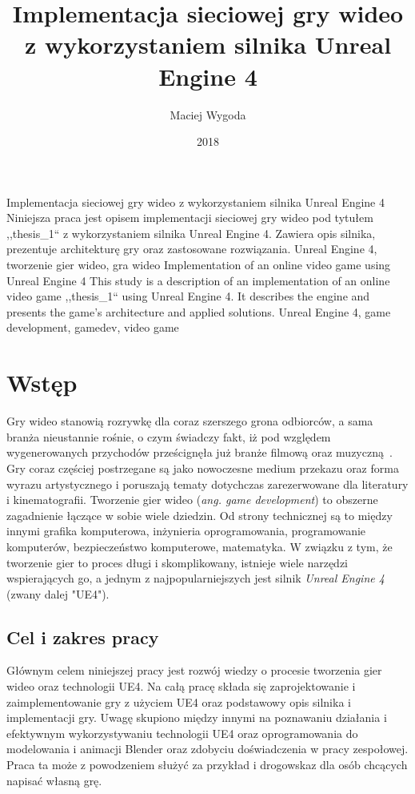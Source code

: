 \documentclass[multip]{SGGW-thesis}
\title{Implementacja sieciowej gry wideo z wykorzystaniem silnika Unreal Engine 4}
\author{Maciej Wygoda}
\date{2018}
\begin{document}
\maketitle
{}
\statementpage
\abstractpage
{Implementacja sieciowej gry wideo z wykorzystaniem silnika Unreal Engine 4}
{Niniejsza praca jest opisem implementacji sieciowej gry wideo pod tytułem ,,thesis\_1`` z wykorzystaniem silnika Unreal Engine 4. Zawiera opis silnika, prezentuje architekturę gry oraz zastosowane rozwiązania.}
{Unreal Engine 4, tworzenie gier wideo, gra wideo}
{Implementation of an online video game using Unreal Engine 4}
{This study is a description of an implementation of an online video game ,,thesis\_1`` using Unreal Engine 4. It describes the engine and presents the game's architecture and applied solutions.}
{Unreal Engine 4, game development, gamedev, video game}

\tableofcontents

\chapter{Wstęp}
Gry wideo stanowią rozrywkę dla coraz szerszego grona odbiorców, a sama branża nieustannie rośnie, o czym świadczy fakt, iż pod względem wygenerowanych przychodów prześcignęła już branże filmową oraz muzyczną~\cite{nasdaq-video-games-industry}. Gry coraz częściej postrzegane są jako nowoczesne medium przekazu oraz forma wyrazu artystycznego i poruszają tematy dotychczas zarezerwowane dla literatury i kinematografii. 
\newline \indent Tworzenie gier wideo ({\em ang. game development}) to obszerne zagadnienie łączące w sobie wiele dziedzin. Od strony technicznej są to między innymi grafika komputerowa, inżynieria oprogramowania, programowanie komputerów, bezpieczeństwo komputerowe, matematyka. W związku z tym, że tworzenie gier to proces długi i skomplikowany, istnieje wiele narzędzi wspierających go, a jednym z najpopularniejszych jest silnik {\em Unreal Engine 4} (zwany dalej "UE4").
\section{Cel i zakres pracy}
Głównym celem niniejszej pracy jest rozwój wiedzy o procesie tworzenia gier wideo oraz technologii UE4.  Na całą pracę składa się zaprojektowanie i zaimplementowanie gry z użyciem UE4 oraz podstawowy opis silnika i implementacji gry. 
\newline \indent Uwagę skupiono między innymi na poznawaniu działania i efektywnym wykorzystywaniu technologii UE4 oraz oprogramowania do modelowania i animacji Blender oraz zdobyciu doświadczenia w pracy zespołowej.
Praca ta może z powodzeniem służyć za przykład i drogowskaz dla osób chcących napisać własną grę.
\end{document}
